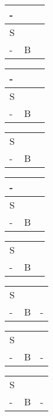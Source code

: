 \documentclass{article}
\newcommand{\wombat}{\cellcolor{newred}}
\newcommand{\pit}{\cellcolor{newblue}}
\newcommand{\wompit}{\cellcolor{newpurple}}
\begin{document}
	\begin{center}
		\begin{tabular}{|m{0.25cm}|m{0.25cm}|m{0.25cm}|}
			\hline
			- &&  \\ \hline
			S & \pit &\\ \hline
			- & B & \wompit \\ \hline
		\end{tabular}
		\quad
		\begin{tabular}{|m{0.25cm}|m{0.25cm}|m{0.25cm}|}
			\hline
			- &&  \\ \hline
			S & \wompit & \\ \hline
			- & B & \pit \\ \hline
		\end{tabular}
		\quad
		\begin{tabular}{|m{0.25cm}|m{0.25cm}|m{0.25cm}|}
			\hline
			\wombat &&  \\ \hline
			S & \pit & \\ \hline
			- & B & \pit \\ \hline
		\end{tabular}
		\quad
		\begin{tabular}{|m{0.25cm}|m{0.25cm}|m{0.25cm}|}
			\hline
			- &&  \\ \hline
			S & \pit & \\ \hline
			- & B & \pit \\ \hline
		\end{tabular}
	\end{center}

	\begin{center}
		\begin{tabular}{|m{0.25cm}|m{0.25cm}|m{0.25cm}|}
			\hline
			\pit &&  \\ \hline
			S & \pit &\\ \hline
			- & B & \wombat \\ \hline
		\end{tabular}
		\quad
		\begin{tabular}{|m{0.25cm}|m{0.25cm}|m{0.25cm}|}
			\hline
			\pit &&  \\ \hline
			S & \wompit & \\ \hline
			- & B & - \\ \hline
		\end{tabular}
		\quad
		\begin{tabular}{|m{0.25cm}|m{0.25cm}|m{0.25cm}|}
			\hline
			\wompit &&  \\ \hline
			S & \pit & \\ \hline
			- & B & - \\ \hline
		\end{tabular}
		\quad
		\begin{tabular}{|m{0.25cm}|m{0.25cm}|m{0.25cm}|}
			\hline
			\pit &&  \\ \hline
			S & \pit & \\ \hline
			- & B & - \\ \hline
		\end{tabular}
	\end{center}
\end{document}
